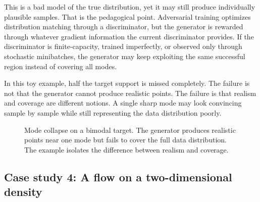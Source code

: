 This is a bad model of the true distribution, yet it may still produce individually plausible samples.
That is the pedagogical point.
Adversarial training optimizes distribution matching through a discriminator, but the generator is rewarded through whatever gradient information the current discriminator provides.
If the discriminator is finite-capacity, trained imperfectly, or observed only through stochastic minibatches, the generator may keep exploiting the same successful region instead of covering all modes.

In this toy example, half the target support is missed completely.
The failure is not that the generator cannot produce realistic points.
The failure is that realism and coverage are different notions.
A single sharp mode may look convincing sample by sample while still representing the data distribution poorly.

\begin{figure}[h]
\centering
{}
\caption{Mode collapse on a bimodal target. The generator produces realistic points near one mode but fails to cover the full data distribution. The example isolates the difference between realism and coverage.}
\label{fig:ganmodecollapse}
\end{figure}

\subsection*{Case study 4: A flow on a two-dimensional density}

